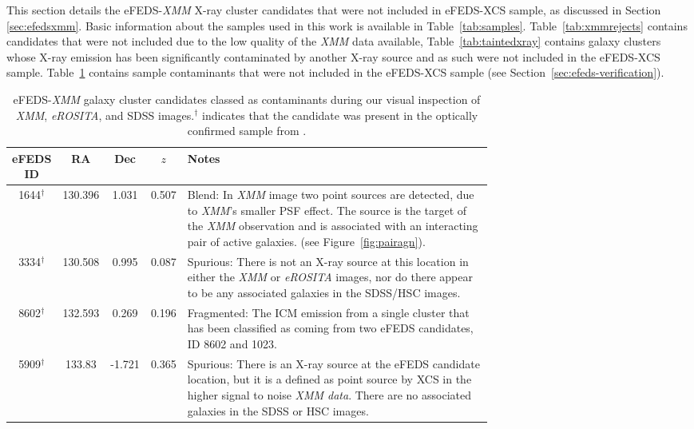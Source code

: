 \documentclass[fleqn,usenatbib]{mnras}
\begin{document}
This section details the eFEDS-{\em XMM} X-ray cluster candidates that were not included in eFEDS-XCS sample, as discussed in Section \ref{sec:efedsxmm}. Basic information about the samples used in this work is available in Table~\ref{tab:samples}. Table~\ref{tab:xmmrejects} contains candidates that were not included due to the low quality of the {\em XMM} data available, Table~\ref{tab:taintedxray} contains galaxy clusters whose X-ray emission has been significantly contaminated by another X-ray source and as such were not included in the eFEDS-XCS sample. Table~\ref{tab:rejects} contains sample contaminants that were not included in the eFEDS-XCS sample (see Section~\ref{sec:efeds-verification}).

\begin{table}
\begin{center}
\caption[]{{eFEDS-{\em XMM} galaxy cluster candidates classed as contaminants during our visual inspection of {\em XMM}, {\em eROSITA}, and SDSS images.\newline $^\dagger$ indicates that the candidate was present in the optically confirmed sample from \cite{efedsclusteropticalcat}.}\label{tab:rejects}}
\vspace{-5mm}
\begin{tabular}{cccc|p{0.70\linewidth}}
\hline
\hline
eFEDS ID & RA & Dec & $z$ &  Notes\\
\hline
\hline
1644$^\dagger$ & 130.396 & 1.031 & 0.507 & Blend: In {\em XMM} image two point sources are detected, due to {\em XMM}'s smaller PSF effect. The source is the target of the {\em XMM} observation and is associated with an interacting pair of active galaxies. (see Figure~\ref{fig:pairagn}).\\ 
\hline
3334$^\dagger$ & 130.508 & 0.995 & 0.087 & Spurious: There is not an X-ray source at this location in either the {\em XMM} or {\em eROSITA} images, nor do there appear to be any associated galaxies in the SDSS/HSC images. \\ 
\hline
8602$^\dagger$ & 132.593 & 0.269 & 0.196 & Fragmented: The ICM emission from a single cluster that has been classified as coming from two eFEDS candidates, ID 8602 and 1023. \\ 
\hline
5909$^\dagger$ & 133.83 & -1.721 & 0.365 & Spurious: There is an X-ray source at the eFEDS candidate location, but it is a defined as point source by XCS in the higher signal to noise {\em XMM data}. There are no associated galaxies in the SDSS or HSC images. \\ 

\end{tabular}
\end{center}
\end{table}
\end{document}
